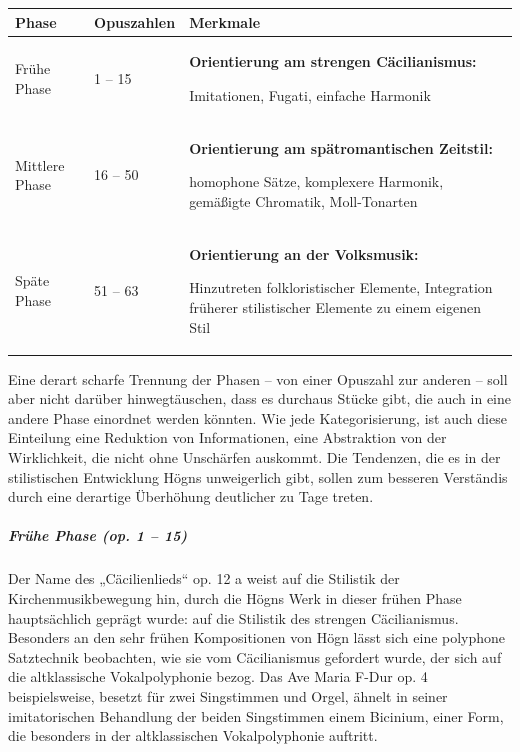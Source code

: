 \documentclass[a4paper]{article}
\begin{document}
\begin{flushleft}
\tablefirsthead{}
\tablehead{}
\tabletail{}
\tablelasttail{}
\begin{supertabular}{|m{3.166cm}|m{2.763cm}|m{9.734cm}|}
\hline
{\bfseries Phase} &
{\bfseries Opuszahlen} &
{\bfseries Merkmale}\\\hline
Frühe Phase &
1 – 15 &
{\bfseries Orientierung am strengen Cäcilianismus: }

Imitationen, Fugati, einfache Harmonik\\\hline
Mittlere Phase &
16 – 50 &
\textbf{Orientierung am spätromantischen Zeitstil:}

homophone Sätze, komplexere Harmonik, gemäßigte Chromatik,
Moll-Tonarten\\\hline
Späte Phase &
51 – 63 &
\textbf{Orientierung an der Volksmusik:}

Hinzutreten folkloristischer Elemente, Integration früherer
stilistischer Elemente zu einem eigenen Stil \\\hline
\end{supertabular}
\end{flushleft}
Eine derart scharfe Trennung der Phasen – von einer Opuszahl zur anderen
– soll aber nicht darüber hinwegtäuschen, dass es durchaus Stücke gibt,
die auch in eine andere Phase einordnet werden könnten. Wie jede
Kategorisierung, ist auch diese Einteilung eine Reduktion von
Informationen, eine Abstraktion von der Wirklichkeit, die nicht ohne
Unschärfen auskommt. Die Tendenzen, die es in der stilistischen
Entwicklung Högns unweigerlich gibt, sollen zum besseren Verständis
durch eine derartige Überhöhung deutlicher zu Tage treten.

\subparagraph{Frühe Phase (op. 1 – 15)}
Der Name des „Cäcilienlieds“ op. 12 a weist auf die Stilistik der
Kirchenmusikbewegung hin, durch die Högns Werk in dieser frühen Phase
hauptsächlich geprägt wurde: auf die Stilistik des strengen
Cäcilianismus. Besonders an den sehr frühen Kompositionen von Högn
lässt sich eine polyphone Satztechnik beobachten, wie sie vom
Cäcilianismus gefordert wurde, der sich auf die altklassische
Vokalpolyphonie bezog. Das Ave Maria F-Dur op. 4 beispielsweise,
besetzt für zwei Singstimmen und Orgel, ähnelt in seiner imitatorischen
Behandlung der beiden Singstimmen einem Bicinium, einer Form, die
besonders in der altklassischen Vokalpolyphonie auftritt.
\end{document}
